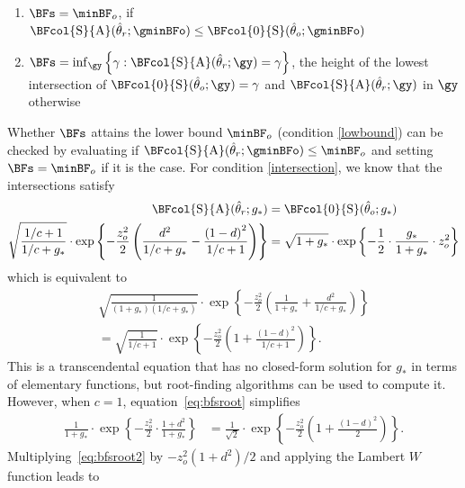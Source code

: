\begin{subappendices}
\begin{enumerate}
  \item \label{lowbound} $\BFs = \minBF_{o}$, if
  $\BFcol{\text{S}}{\text{A}}(\hat{\theta}_r; \gminBFo) \leq
  \BFcol{0}{\text{S}}(\hat{\theta}_o; \gminBFo)$

  \item \label{intersection}
  $\BFs = \inf_{\gy}
  \left\{\gamma : \BFcol{\text{S}}{\text{A}}(\hat{\theta}_r; \gy)
  = \gamma\right\}$,
  the height of the lowest intersection of
  $\BFcol{0}{\text{S}}(\hat{\theta}_o; \gy) = \gamma$ and
  $\BFcol{\text{S}}{\text{A}}(\hat{\theta}_r; \gy)$
  in $\gy$ otherwise
\end{enumerate}
Whether $\BFs$ attains the lower bound $\minBF_{o}$ (condition \ref{lowbound})
can be checked by evaluating if
$\BFcol{\text{S}}{\text{A}}(\hat{\theta}_r; \gminBFo) \leq \minBF_{o}$ and setting
$\BFs = \minBF_{o}$ if it is the case. For condition \ref{intersection}, we know
that the intersections satisfy
\begin{align*}
  \BFcol{\text{S}}{\text{A}}(\hat{\theta}_r; g_*) &=
  \BFcol{0}{\text{S}}(\hat{\theta}_o; g_*) \\
  \sqrt{\frac{1/c + 1}{1/c + g_*}} \cdot
  \exp\left\{-\frac{z_{o}^{2}}{2}\left(\frac{d^2}{1/c + g_*} -
  \frac{\left(1 - d\right)^2}{1/c + 1} \right)\right\}
  &= \sqrt{1 + g_*} \cdot
  \exp\left\{-\frac{1}{2} \cdot \frac{g_*}{1 + g_*} \cdot z^2_o\right\}
\end{align*}
which is equivalent to
\begin{align}
  \sqrt{\frac{1}{(1 + g_*)(1/c + g_*)}}\cdot\exp\left\{-\frac{z_{o}^{2}}{2}\left(
  \frac{1}{1 + g_*} + \frac{d^{2}}{1/c + g_*}\right)\right\} \nonumber \\
  = \sqrt{\frac{1}{1/c + 1}}\cdot\exp\left\{-\frac{z_{o}^{2}}{2}\left(
  1 + \frac{(1 - d)^{2}}{1/c + 1}\right)\right\}.
  \label{eq:bfsroot}
\end{align}
This is a transcendental equation that has no closed-form solution for $g_*$ in
terms of elementary functions, but root-finding algorithms can be used to
compute it. However, when $c = 1$, equation~\eqref{eq:bfsroot} simplifies
\begin{align}
  \label{eq:bfsroot2}
  \frac{1}{1 + g_*}\cdot\exp\left\{-\frac{z_{o}^{2}}{2} \cdot
  \frac{1 + d^{2}}{1 + g_*}\right\}
  &= \frac{1}{\sqrt{2}}\cdot\exp\left\{-\frac{z_{o}^{2}}{2}\left(
  1 + \frac{(1 - d)^{2}}{2}\right)\right\}.
\end{align}
Multiplying~\eqref{eq:bfsroot2} by $-z_{o}^{2}(1 + d^{2})/2$ and applying the
Lambert $W$ function leads to
\begin{align}

\end{align}
\end{subappendices}
